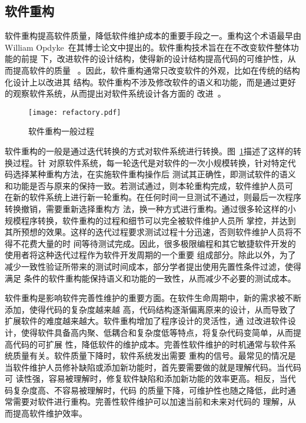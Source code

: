 \subsection{软件重构}

软件重构提高软件质量，降低软件维护成本的重要手段之一。重构这个术语最早由William
Opdyke~\cite{opdyke1992refactoring}在其博士论文中提出的。软件重构技术旨在在不改变软件整体功能的前提
下，改进软件的设计结构，使得新的设计结构提高代码的可维护性，从而提高软件的质量
~\cite{fowler1999refactoring}。因此，软件重构通常只改变软件的外观，比如在传统的结构化设计上以改进其
结构。软件重构不涉及修改软件的语义和功能，而是通过更好的观察软件系统，从而提出对软件系统设计各方面的
改进~\cite{chikofsky1990reverse}。

\begin{figure}
  \centering
  \texttt{[image: refactory.pdf]}  
  \caption{\label{fig:refactory}软件重构一般过程}
\end{figure}

软件重构的一般是通过迭代转换的方式对软件系统进行转换。图~\ref{fig:refactory}描述了这样的转换过程。针
对原软件系统，每一轮迭代是对软件的一次小规模转换，针对特定代码选择某种重构方法，在实施软件重构操作后
测试其正确性，即测试软件的语义和功能是否与原来的保持一致。若测试通过，则本轮重构完成，软件维护人员可
在新的软件系统上进行新一轮重构。在任何时间一旦测试不通过，则最后一次程序转换撤销，需要重新选择重构方
法，换一种方式进行重构。通过很多轮这样的小规模程序转换，软件重构的过程和细节可以完全被软件维护人员所
掌控，并达到其所预想的效果。这样的迭代过程要求测试过程十分迅速，否则软件维护人员将不得不花费大量的时
间等待测试完成。因此，很多极限编程和其它敏捷软件开发的使用者将这种迭代过程作为软件开发周期的一个重要
组成部分。除此以外，为了减少一致性验证所带来的测试时间成本，部分学者提出使用先置性条件过滤，使得满足
条件的软件重构能保持语义和功能的一致性，从而减少不必要的测试成本。

软件重构是影响软件完善性维护的重要方面。在软件生命周期中，新的需求被不断添加，使得代码的复杂度越来越
高，代码结构逐渐偏离原来的设计，从而导致了扩展软件的难度越来越大。软件重构增加了程序设计的灵活性，通
过改进软件设计，使得软件具备高内聚、低耦合和复杂度低等特点，将复杂代码变简单，从而提高代码的可扩展
性，降低软件的维护成本。完善性软件维护的时机通常与软件系统质量有关。软件质量下降时，软件系统发出需要
重构的信号。最常见的情况是当软件维护人员修补缺陷或添加新功能时，首先要需要做的就是理解代码。当代码可
读性强，容易被理解时，修复软件缺陷和添加新功能的效率更高。相反，当代码复杂度高、不容易被理解时，代码
的质量下降，可维护性也随之降低，此时通常需要对软件进行重构。完善性软件维护可以加速当前和未来对代码的
理解，从而提高软件维护效率。

